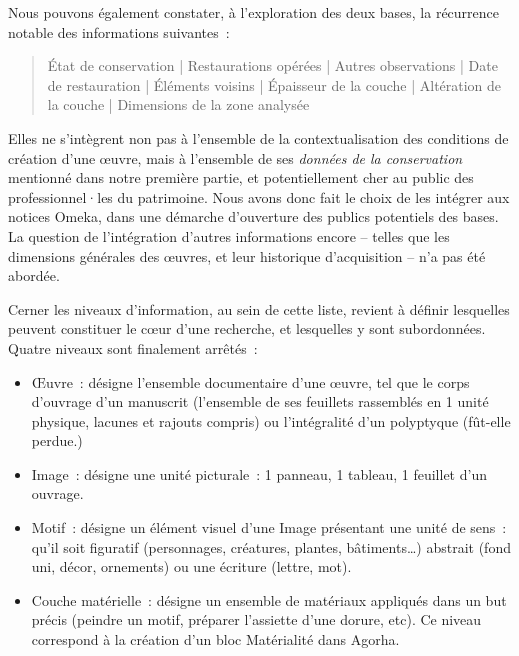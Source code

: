 \documentclass[a4paper,12pt, twoside]{book}
\begin{document}
Nous pouvons également constater, à l’exploration des deux bases, la récurrence notable des informations suivantes~:

\begin{quote}
    \textsf{État de conservation | Restaurations opérées | Autres observations | Date de restauration | Éléments voisins | Épaisseur de la couche | Altération de la couche | Dimensions de la zone analysée}
\end{quote}

Elles ne s’intègrent non pas à l’ensemble de la contextualisation des conditions de création d’une œuvre, mais à l’ensemble de ses \textit{données de la conservation} mentionné dans notre première partie, et potentiellement cher au public des professionnel·les du patrimoine. Nous avons donc fait le choix de les intégrer aux notices Omeka, dans une démarche d’ouverture des publics potentiels des bases. La question de l’intégration d’autres informations encore – telles que les dimensions générales des œuvres, et leur historique d’acquisition – n’a pas été abordée.

Cerner les niveaux d’information, au sein de cette liste, revient à définir lesquelles peuvent constituer le cœur d’une recherche, et lesquelles y sont subordonnées. Quatre niveaux sont finalement arrêtés~:

\begin{itemize}
    \item \textsf{Œuvre}~: désigne l’ensemble documentaire d’une œuvre, tel que le corps d’ouvrage d’un manuscrit (l’ensemble de ses feuillets rassemblés en 1 unité physique, lacunes et rajouts compris) ou l’intégralité d’un polyptyque (fût-elle perdue.)

    \item \textsf{Image}~: désigne une unité picturale~: 1 panneau, 1 tableau, 1 feuillet d’un ouvrage.

    \item \textsf{Motif}~: désigne un élément visuel d’une Image présentant une unité de sens~: qu’il soit figuratif (personnages, créatures, plantes, bâtiments…) abstrait (fond uni, décor, ornements) ou une écriture (lettre, mot).

    \item \textsf{Couche matérielle}~: désigne un ensemble de matériaux appliqués dans un but précis (peindre un motif, préparer l’assiette d’une dorure, etc). Ce niveau correspond à la création d’un bloc \textsf{Matérialité} dans Agorha.
\end{itemize}    
\end{document}
